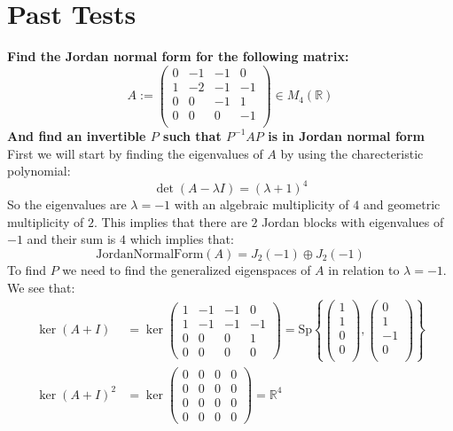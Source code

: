 \documentclass[11pt,a4paper]{article}
\theoremstyle{plain}
\newcommand{\Sp}{\text{Sp}}
\newcommand{\R}{\mathbb{R}}
\begin{document}
	\section{Past Tests}
	\textbf{Find the Jordan normal form for the following matrix:
	\[
	A := \begin{pmatrix}
	0 & -1 & -1 & 0\\
	1 & -2 & -1 & -1\\
	0 & 0 & -1 & 1\\
	0 & 0 & 0 & -1\\
	\end{pmatrix} \in M_4(\R)
	\]
	And find an invertible $P$ such that  $P^{-1}AP$ is in Jordan normal form}\\
	First we will start by finding the eigenvalues of $A$ by using the
	charecteristic polynomial:
	\[
		\det(A - \lambda I) = (\lambda + 1)^4
	\]
	So the eigenvalues are $\lambda = -1$ with an algebraic multiplicity of $4$
	and geometric multiplicity of $2$. This implies that there are $2$ Jordan
	blocks with eigenvalues of $-1$ and their sum is $4$ which implies that:
	\[
		\mathrm{JordanNormalForm}(A) = J_2(-1) \oplus J_2(-1)
	\]
	To find $P$ we need to find the generalized eigenspaces of $A$ in relation
	to $\lambda = -1$. We see that:
	\begin{align*}
		\ker(A+I) &= \ker
		\left(\begin{matrix}
		1 & -1 & -1 & 0 \\
		1 & -1 & -1 & -1 \\
		0 & 0 & 0 & 1 \\
		0 & 0 & 0 & 0
		\end{matrix}\right) = 
		\Sp\left\{
		\begin{pmatrix}
			1\\
			1\\
			0\\
			0\\
		\end{pmatrix},
		\begin{pmatrix}
			0\\
			1\\
			-1\\
			0\\
		\end{pmatrix}
		\right\} \\
		\ker(A+I)^2 &= \ker
		\left(\begin{matrix}
		0 & 0 & 0 & 0 \\
		0 & 0 & 0 & 0 \\
		0 & 0 & 0 & 0 \\
		0 & 0 & 0 & 0
		\end{matrix}\right) = \R^4
	\end{align*}
\end{document}
